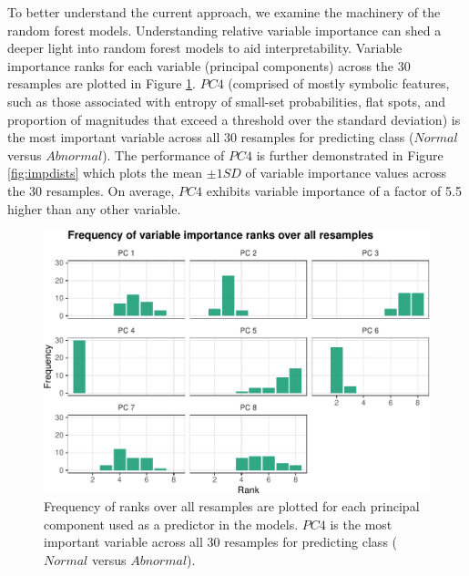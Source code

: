 \documentclass{article}
\begin{document}
To better understand the current approach, we examine the machinery of the random forest models. Understanding relative variable importance can shed a deeper light into random forest models to aid interpretability. Variable importance ranks for each variable (principal components) across the 30 resamples are plotted in Figure \ref{fig:impranks}. \(PC 4\) (comprised of mostly symbolic features, such as those associated with entropy of small-set probabilities, flat spots, and proportion of magnitudes that exceed a threshold over the standard deviation) is the most important variable across all 30 resamples for predicting class (\(Normal\) versus \(Abnormal\)). The performance of \(PC 4\) is further demonstrated in Figure \ref{fig:impdists} which plots the mean \(\pm1SD\) of variable importance values across the 30 resamples. On average, \(PC 4\) exhibits variable importance of a factor of 5.5 higher than any other variable.

\begin{figure}
\centering
\includegraphics{olet5610_report_files/figure-latex/impranks-1.pdf}
\caption{\label{fig:impranks}Frequency of ranks over all resamples are plotted for each principal component used as a predictor in the models. \(PC 4\) is the most important variable across all 30 resamples for predicting class (\(Normal\) versus \(Abnormal\)).}
\end{figure}
\end{document}
